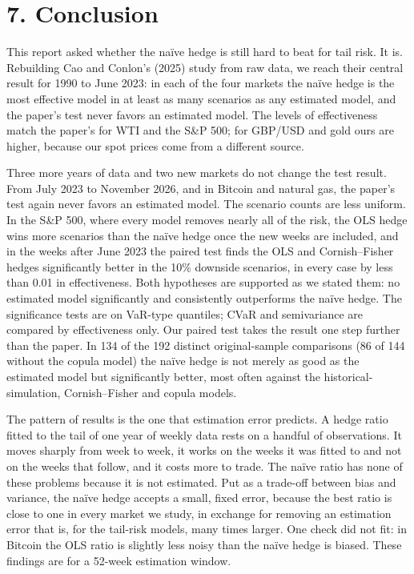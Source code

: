 \documentclass[11pt,letterpaper]{article}
\begin{document}
\section*{7. Conclusion}

This report asked whether the naïve hedge is still hard to beat for tail risk. It is. Rebuilding Cao and Conlon's (2025) study from raw data, we reach their central result for 1990 to June 2023: in each of the four markets the naïve hedge is the most effective model in at least as many scenarios as any estimated model, and the paper's test never favors an estimated model. The levels of effectiveness match the paper's for WTI and the S\&P 500; for GBP/USD and gold ours are higher, because our spot prices come from a different source.

Three more years of data and two new markets do not change the test result. From July 2023 to November 2026, and in Bitcoin and natural gas, the paper's test again never favors an estimated model. The scenario counts are less uniform. In the S\&P 500, where every model removes nearly all of the risk, the OLS hedge wins more scenarios than the naïve hedge once the new weeks are included, and in the weeks after June 2023 the paired test finds the OLS and Cornish–Fisher hedges significantly better in the 10\% downside scenarios, in every case by less than 0.01 in effectiveness. Both hypotheses are supported as we stated them: no estimated model significantly and consistently outperforms the naïve hedge. The significance tests are on VaR-type quantiles; CVaR and semivariance are compared by effectiveness only. Our paired test takes the result one step further than the paper. In 134 of the 192 distinct original-sample comparisons (86 of 144 without the copula model) the naïve hedge is not merely as good as the estimated model but significantly better, most often against the historical-simulation, Cornish–Fisher and copula models.

The pattern of results is the one that estimation error predicts. A hedge ratio fitted to the tail of one year of weekly data rests on a handful of observations. It moves sharply from week to week, it works on the weeks it was fitted to and not on the weeks that follow, and it costs more to trade. The naïve ratio has none of these problems because it is not estimated. Put as a trade-off between bias and variance, the naïve hedge accepts a small, fixed error, because the best ratio is close to one in every market we study, in exchange for removing an estimation error that is, for the tail-risk models, many times larger. One check did not fit: in Bitcoin the OLS ratio is slightly less noisy than the naïve hedge is biased. These findings are for a 52-week estimation window.
\end{document}
